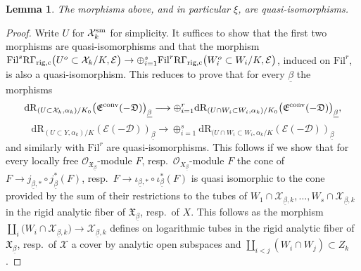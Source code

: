 \documentclass[asterisque,english]{smfart}
\newtheorem{lemma}[theo]{Lemma}
\begin{document}
\begin{lemma}\label{lemma:xiiso} The morphisms above, and in particular $\xi$, are  quasi-isomorphisms.
\end{lemma}
\begin{proof} Write $U$ for $\mathcal{X}_k^{\rm sm}$ for simplicity. It suffices to show that  the first two morphisms are quasi-isomorphisms and that the morphism $\mathrm{Fil}^s\mathrm{R\Gamma}_{\rm rig,c}\bigl( U^o\subset \mathcal{X}_k/K ,\mathcal{E}\bigr) \to \oplus_{i=1}^s \mathrm{Fil}^r \mathrm{R\Gamma}_{\rm rig,c}\bigl( W_i^o \subset W_i/K ,\mathcal{E}\bigr)$, induced on $\mathrm{Fil}^r$, is also a quasi-isomorphism. This reduces  to prove that for every $\underline{\beta}$ the morphisms $$ \mathrm{dR}_{(U\subset \mathcal{X}_k,\alpha_k)/K_0} \bigl(\mathfrak{E}^{\rm conv}(-\mathfrak{D})\bigr)_{\underline{\beta}}\longrightarrow \oplus_{i=1}^r
\mathrm{dR}_{(U\cap W_i \subset W_i,\alpha_k)/K_0} \bigl(\mathfrak{E}^{\rm conv}(-\mathfrak{D})\bigr)_{\underline{\beta}},$$
$$\mathrm{dR}_{(U\subset Y,\alpha_k)/K} (\mathcal{E}(-\mathcal{D}))_{\underline{\beta}}\longrightarrow \oplus_{i=1}^s \mathrm{dR}_{(U\cap W_i \subset W_i,\alpha_k/K} (\mathcal{E}(-\mathcal{D}))_{\underline{\beta}}$$and similarly with $\mathrm{Fil}^r$ are quasi-isomorphisms. This follows if we show that for every locally free $\mathcal{O}_{\mathfrak{X}_{\underline{\beta}}}$-module $F$, resp.~$\mathcal{O}_{X_{\underline{\beta}}}$-module $F$ the cone of $F\to  j_{\underline{\beta},\ast} \circ j_{\underline{\beta}}^\ast(F)$, resp.~$F\to   \iota_{\underline{\beta},\ast} \circ \iota_{\underline{\beta}}^\ast(F)$ is quasi isomorphic to the cone provided by the sum of their restrictions to the tubes of $W_1\cap \mathcal{X}_{\underline{\beta},k}, \ldots, W_s\cap \mathcal{X}_{\underline{\beta},k}$  in the rigid analytic fiber of $\mathfrak{X}_{\underline{\beta}}$, resp.~of $X$.  This follows as the morphism $\amalg_i \bigl(W_i\cap \mathcal{X}_{\underline{\beta},k}\bigr) \to \mathcal{X}_{\underline{\beta},k}$ defines on logarithmic tubes in the rigid analytic fiber of $\mathfrak{X}_{\underline{\beta}}$, resp.~of $\mathcal{X}$ a cover by analytic open subspaces and $\amalg_{i<j} (W_i\cap W_j)\subset Z_k$.  
\end{proof}
\end{document}
